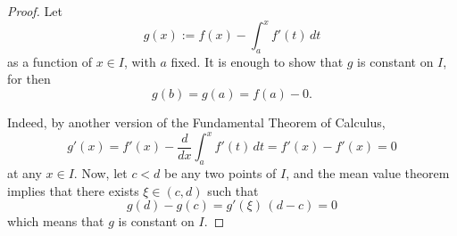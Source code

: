 

\begin{proof}

Let 
$$
g(x) := f(x) - \int_a^x f'(t)\,dt 
$$
as a function of $x\in I$, with $a$ fixed. It is enough to 
show that $g$ is constant on $I$, for then 
$$
g(b) = g(a) = f(a) - 0.
$$

Indeed, by another version of the Fundamental Theorem of Calculus,
$$
g'(x) = f'(x) - \frac{d}{dx}\int_a^x f'(t)\,dt = f'(x) - f'(x) = 0
$$
at any $x\in I$. Now, let $c<d$ be any two points of $I$, and the 
mean value theorem implies that there exists $\xi\in (c,d)$ such that
$$
g(d) - g(c) = g'(\xi)\, (d-c) = 0
$$
which means that $g$ is constant on $I$.

\end{proof}

